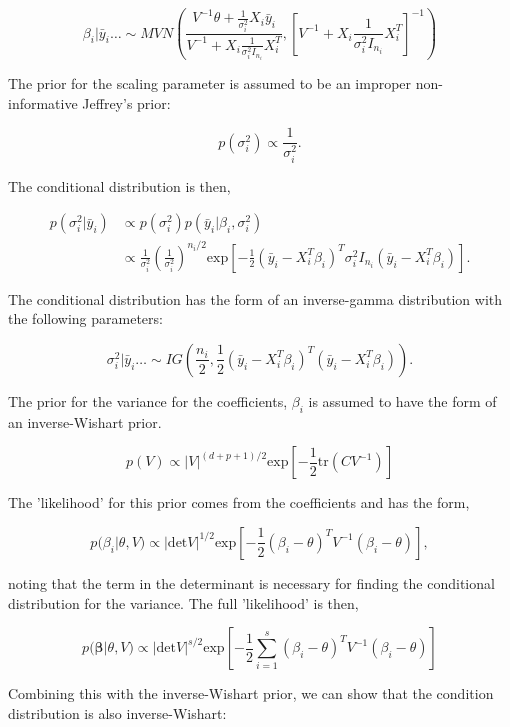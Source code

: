 \documentclass[12pt]{article}
\begin{document}
    $$\beta_i | \bar{y}_i \dots \sim MVN\left(\frac{V^{-1} \theta + \frac{1}{\sigma_i^2 }X_i \bar{y}_i }{V^{-1} + X_i \frac{1}{\sigma_i^2 I_{n_i}} X_i^T}, \left[V^{-1} + X_i \frac{1}{\sigma_i^2 I_{n_i}} X_i^T \right]^{-1} \right)$$

    The prior for the scaling parameter is assumed to be an improper non-informative Jeffrey's prior:

    $$p(\sigma_i^2) \propto \frac{1}{\sigma_i^2}.$$

    \noindent The conditional distribution is then,

    \begin{align*}
    p(\sigma_i^2| \bar{y}_i) &\propto p(\sigma_i^2) p(\bar{y}_i | \beta_i, \sigma_i^2) \\
    & \propto \frac{1}{\sigma_i^2} \left(\frac{1}{\sigma_i^2}\right)^{n_i/2} \text{exp}\left[ -\frac{1}{2} (\bar{y}_i - X_i^T \beta_i)^T \sigma_i^2 I_{n_i} (\bar{y}_i - X_i^T \beta_i)\right].
    \end{align*}

    \noindent The conditional distribution has the form of an inverse-gamma distribution with the following parameters:

    $$\sigma_i^2 | \bar{y}_i \dots \sim IG\left(\frac{n_i}{2},  \frac{1}{2} (\bar{y}_i - X_i^T \beta_i)^T (\bar{y}_i - X_i^T \beta_i)\right).$$

    The prior for the variance for the coefficients, $\beta_i$ is assumed to have the form of an inverse-Wishart prior.

    $$p(V) \propto |V|^{(d+p+1)/2} \text{exp}\left[-\frac{1}{2} \text{tr}(C V^{-1}) \right]$$

    The 'likelihood' for this prior comes from the coefficients and has the form,

    $$p(\beta_i | \theta, V) \propto | \text{det} V |^{1/2} \text{exp}\left[-\frac{1}{2} (\beta_i - \theta)^T V^{-1} (\beta_i - \theta) \right],$$

    \noindent noting that the term in the determinant is necessary for finding the conditional distribution for the variance. The full 'likelihood' is then,

    $$p(\mathbf{\beta} | \theta, V) \propto | \text{det} V |^{s/2} \text{exp}\left[-\frac{1}{2} \sum_{i=1}^s (\beta_i - \theta)^T V^{-1} (\beta_i - \theta) \right] $$

    \noindent Combining this with the inverse-Wishart prior, we can show that the condition distribution is also inverse-Wishart:
\end{document}
